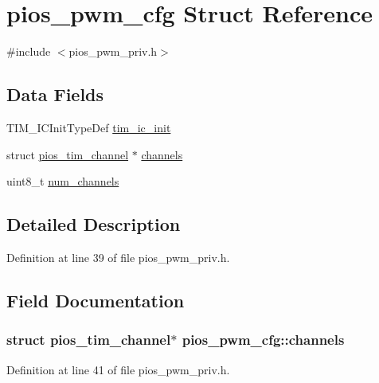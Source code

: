 \hypertarget{structpios__pwm__cfg}{\section{pios\-\_\-pwm\-\_\-cfg \-Struct \-Reference}
\label{structpios__pwm__cfg}
}


{\ttfamily \#include $<$pios\-\_\-pwm\-\_\-priv.\-h$>$}

\subsection*{\-Data \-Fields}
\begin{DoxyCompactItemize}
\item 
\-T\-I\-M\-\_\-\-I\-C\-Init\-Type\-Def \hyperlink{structpios__pwm__cfg_a7f64d325db8aca0d737d94648b079b36}{tim\-\_\-ic\-\_\-init}
\item 
struct \hyperlink{structpios__tim__channel}{pios\-\_\-tim\-\_\-channel} $\ast$ \hyperlink{structpios__pwm__cfg_a54b5c61baa9d577ea2344b3894d1687e}{channels}
\item 
uint8\-\_\-t \hyperlink{structpios__pwm__cfg_acf9d41bfa9ce5ee489fcb27a98605e5c}{num\-\_\-channels}
\end{DoxyCompactItemize}


\subsection{\-Detailed \-Description}


\-Definition at line 39 of file pios\-\_\-pwm\-\_\-priv.\-h.



\subsection{\-Field \-Documentation}
\hypertarget{structpios__pwm__cfg_a54b5c61baa9d577ea2344b3894d1687e}{
\subsubsection[{channels}]{\setlength{\rightskip}{0pt plus 5cm}struct {\bf pios\-\_\-tim\-\_\-channel}$\ast$ {\bf pios\-\_\-pwm\-\_\-cfg\-::channels}}}\label{structpios__pwm__cfg_a54b5c61baa9d577ea2344b3894d1687e}


\-Definition at line 41 of file pios\-\_\-pwm\-\_\-priv.\-h.


